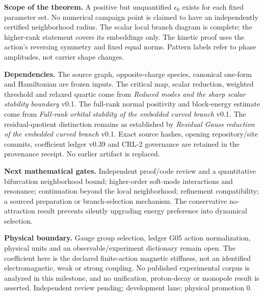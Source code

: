\documentclass[11pt,a4paper]{article}
\begin{document}
\textbf{Scope of the theorem.} A positive but unquantified $\epsilon_0$ exists for each fixed parameter set. No numerical campaign point is claimed to have an independently certified neighborhood radius. The scalar local branch diagram is complete; the higher-rank statement covers its embeddings only. The kinetic proof uses the action's reversing symmetry and fixed equal norms. Pattern labels refer to phase amplitudes, not carrier shape changes.

\textbf{Dependencies.} The source graph, opposite-charge species, canonical one-form and Hamiltonian are frozen inputs. The critical map, scalar reduction, weighted threshold and relaxed quartic come from \emph{Reduced modes and the sharp scalar stability boundary} v0.1. The full-rank normal positivity and block-energy estimate come from \emph{Full-rank orbital stability of the embedded curved branch} v0.1. The residual-quotient distinction remains as established by \emph{Residual Gauss reduction of the embedded curved branch} v0.1. Exact source hashes, opening repository/site commits, coefficient ledger v0.39 and CRL-2 governance are retained in the provenance receipt. No earlier artifact is replaced.

\textbf{Next mathematical gates.} Independent proof/code review and a quantitative bifurcation neighborhood bound; higher-order soft-mode interactions and resonance; continuation beyond the local neighborhood; refinement compatibility; a sourced preparation or branch-selection mechanism. The conservative no-attraction result prevents silently upgrading energy preference into dynamical selection.

\textbf{Physical boundary.} Gauge group selection, ledger G05 action normalization, physical units and an observable/experiment dictionary remain open. The coefficient here is the declared finite-action magnetic stiffness, not an identified electromagnetic, weak or strong coupling. No published experimental corpus is analyzed in this milestone, and no unification, proton-decay or monopole result is asserted. Independent review pending; development lane; physical promotion $0$.
\end{document}
